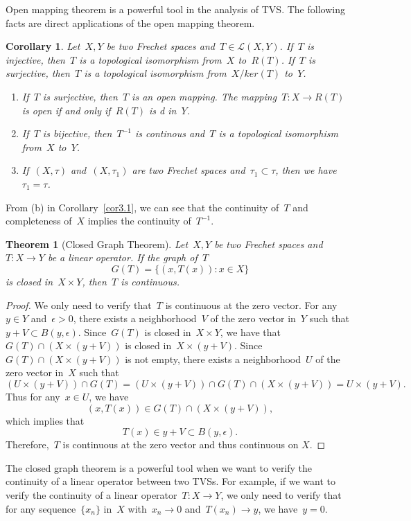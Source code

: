 \documentclass[12pt,a4paper,draft]{article}  %
\newtheorem{theorem}{Theorem}[section]
\newtheorem{corollary}{Corollary}[section]
\theoremstyle{definition}
\numberwithin{equation}{section}
\begin{document}
Open mapping theorem is a powerful tool in the analysis of TVS.
The following facts are direct applications of the open mapping theorem.
\begin{corollary} \label{cor3.1}
    Let~$X,Y$ be two Frechet spaces and~$T \in \mathcal{L}(X,Y)$.
     If~$T$ is injective, then~$T$ is a topological isomorphism from~$X$ to~$R(T)$.
     If~$T$ is surjective, then~$T$ is a topological isomorphism from~$X/ker(T)$ to~$Y$.
    \begin{enumerate}
        \item If~$T$ is surjective, then~$T$ is an open mapping. The mapping~$T:X \rightarrow R(T)$ 
        is open if and only if~$R(T)$ is d in~$Y$.
        \item If~$T$ is bijective, then~$T^{-1}$ is continous and~$T$ is a topological isomorphism from~$X$ to~$Y$.
        \item If~$(X,\tau)$ and~$(X,\tau_1)$ are two Frechet spaces and~$\tau_1 \subset \tau$, then we have~$\tau_1 = \tau$.
    \end{enumerate}
\end{corollary}

From (b) in Corollary~\eqref{cor3.1}, we can see that the continuity of~$T$ and completeness of~$X$ 
implies the continuity of~$T^{-1}$.

\begin{theorem}[Closed Graph Theorem]
    Let~$X,Y$ be two Frechet spaces and~$T: X \rightarrow Y$ be a linear operator.
    If the graph of~$T$ 
    $$ G(T)=\{(x,T(x)): x \in X\} $$
    is closed in~$X \times Y$, then~$T$ is continuous.
\end{theorem}
\begin{proof}
    We only need to verify that~$T$ is continuous at the zero vector.
    For any~$y \in Y$ and~$\epsilon > 0$, there exists a neighborhood~$V$ of the zero vector in~$Y$ such that~$y+V \subset B(y,\epsilon)$.
    Since~$G(T)$ is closed in~$X \times Y$, we have that~$G(T) \cap (X \times (y+V))$ is closed in~$X \times (y+V)$.
    Since~$G(T) \cap (X \times (y+V))$ is not empty, there exists a neighborhood~$U$ of the zero vector in~$X$ such that
    $$(U \times (y+V)) \cap G(T) = (U \times (y+V)) \cap G(T) \cap (X \times (y+V)) = U \times (y+V).$$
    Thus for any~$x \in U$, we have
    $$(x,T(x)) \in G(T) \cap (X \times (y+V)),$$ 
    which implies that
    $$T(x) \in y + V \subset B(y,\epsilon).$$
    Therefore,~$T$ is continuous at the zero vector and thus continuous on $X$.
\end{proof}
The closed graph theorem is a powerful tool when we want to verify the continuity of a linear operator between two TVSs.
For example, if we want to verify the continuity of a linear operator~$T: X \rightarrow Y$,
we only need to verify that for any sequence~$\{x_n\}$ in~$X$ with~$x_n \rightarrow 0$ and~$T(x_n) \rightarrow y$, we have~$y=0$.
\end{document}
